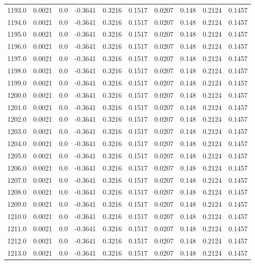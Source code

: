 \begin{longtable}{lrrrrrrrrr}
1193.0 & 0.0021 & 0.0 & -0.3641 & 0.3216 & 0.1517 & 0.0207 & 0.148 & 0.2124 & 0.1457 \\
1194.0 & 0.0021 & 0.0 & -0.3641 & 0.3216 & 0.1517 & 0.0207 & 0.148 & 0.2124 & 0.1457 \\
1195.0 & 0.0021 & 0.0 & -0.3641 & 0.3216 & 0.1517 & 0.0207 & 0.148 & 0.2124 & 0.1457 \\
1196.0 & 0.0021 & 0.0 & -0.3641 & 0.3216 & 0.1517 & 0.0207 & 0.148 & 0.2124 & 0.1457 \\
1197.0 & 0.0021 & 0.0 & -0.3641 & 0.3216 & 0.1517 & 0.0207 & 0.148 & 0.2124 & 0.1457 \\
1198.0 & 0.0021 & 0.0 & -0.3641 & 0.3216 & 0.1517 & 0.0207 & 0.148 & 0.2124 & 0.1457 \\
1199.0 & 0.0021 & 0.0 & -0.3641 & 0.3216 & 0.1517 & 0.0207 & 0.148 & 0.2124 & 0.1457 \\
1200.0 & 0.0021 & 0.0 & -0.3641 & 0.3216 & 0.1517 & 0.0207 & 0.148 & 0.2124 & 0.1457 \\
1201.0 & 0.0021 & 0.0 & -0.3641 & 0.3216 & 0.1517 & 0.0207 & 0.148 & 0.2124 & 0.1457 \\
1202.0 & 0.0021 & 0.0 & -0.3641 & 0.3216 & 0.1517 & 0.0207 & 0.148 & 0.2124 & 0.1457 \\
1203.0 & 0.0021 & 0.0 & -0.3641 & 0.3216 & 0.1517 & 0.0207 & 0.148 & 0.2124 & 0.1457 \\
1204.0 & 0.0021 & 0.0 & -0.3641 & 0.3216 & 0.1517 & 0.0207 & 0.148 & 0.2124 & 0.1457 \\
1205.0 & 0.0021 & 0.0 & -0.3641 & 0.3216 & 0.1517 & 0.0207 & 0.148 & 0.2124 & 0.1457 \\
1206.0 & 0.0021 & 0.0 & -0.3641 & 0.3216 & 0.1517 & 0.0207 & 0.148 & 0.2124 & 0.1457 \\
1207.0 & 0.0021 & 0.0 & -0.3641 & 0.3216 & 0.1517 & 0.0207 & 0.148 & 0.2124 & 0.1457 \\
1208.0 & 0.0021 & 0.0 & -0.3641 & 0.3216 & 0.1517 & 0.0207 & 0.148 & 0.2124 & 0.1457 \\
1209.0 & 0.0021 & 0.0 & -0.3641 & 0.3216 & 0.1517 & 0.0207 & 0.148 & 0.2124 & 0.1457 \\
1210.0 & 0.0021 & 0.0 & -0.3641 & 0.3216 & 0.1517 & 0.0207 & 0.148 & 0.2124 & 0.1457 \\
1211.0 & 0.0021 & 0.0 & -0.3641 & 0.3216 & 0.1517 & 0.0207 & 0.148 & 0.2124 & 0.1457 \\
1212.0 & 0.0021 & 0.0 & -0.3641 & 0.3216 & 0.1517 & 0.0207 & 0.148 & 0.2124 & 0.1457 \\
1213.0 & 0.0021 & 0.0 & -0.3641 & 0.3216 & 0.1517 & 0.0207 & 0.148 & 0.2124 & 0.1457 \\

\end{longtable}
